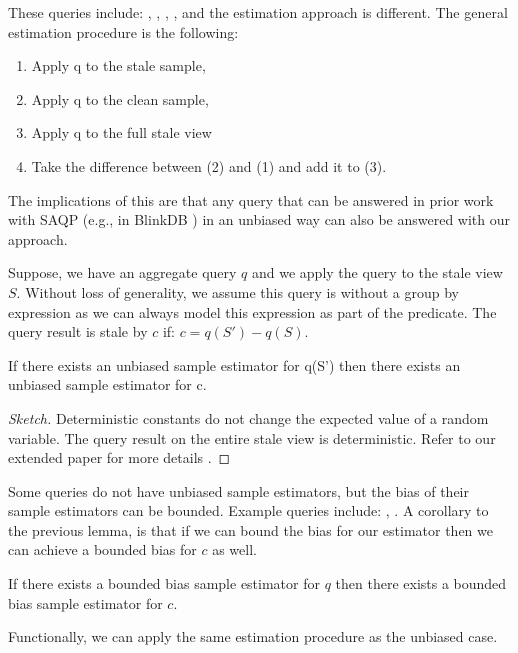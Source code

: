 These queries include: \histfunc, \corrfunc, \varfunc, \covfunc, and the estimation approach is different.
The general estimation procedure is the following:
\begin{enumerate}[noitemsep]
\item Apply q to the stale sample, 
\item Apply q to the clean sample, 
\item Apply q to the full stale view
\item Take the difference between (2) and (1) and add it to (3).
\end{enumerate}
The implications of this are that any query that can be answered in prior work with SAQP (e.g., in BlinkDB \cite{AgarwalMPMMS13}) in an unbiased way can also be answered with our approach.

Suppose, we have an aggregate query $q$ and we apply the query to the stale view $S$.
Without loss of generality, we assume this query is without a group by expression as we can always model this expression as part of the predicate.
The query result is stale by $c$ if:
$ c = q(S') - q(S)$.
\begin{lemma}\label{lemma:unbiased}
If there exists an unbiased sample estimator for q(S') then there exists an unbiased sample estimator for c.
\end{lemma}
\begin{proof}[Sketch] 
Deterministic constants do not change the expected value of a random variable.
The query result on the entire stale view is deterministic.
Refer to our extended paper for more details \cite{technicalReport}.
\end{proof}

\iffalse
Suppose, we have an unbiased sample estimator $\bar{q}$ of $q$. 
Then, it follows that \[\mathbb{E}\big[\bar{q}(\hat{S'})\big] = q(S')\]
If we substitute in this expression:
\[ c = \mathbb{E}\big[\bar{q}(\hat{S'})\big] -q(s) \] 
Applying the linearity of expectation:
\[ c = \mathbb{E}\big[\bar{q}(\hat{S'}) - q(s)\big] \]
\fi

Some queries do not have unbiased sample estimators, but the bias of their sample estimators can be bounded. Example queries include: \medfunc, \percfunc.
A corollary to the previous lemma, is that if we can bound the bias for our estimator then we can achieve a bounded bias for $c$ as well.
\begin{corollary}
If there exists a bounded bias sample estimator for $q$ then there exists a bounded bias sample estimator for $c$.
\end{corollary}
Functionally, we can apply the same estimation procedure as the unbiased case.

